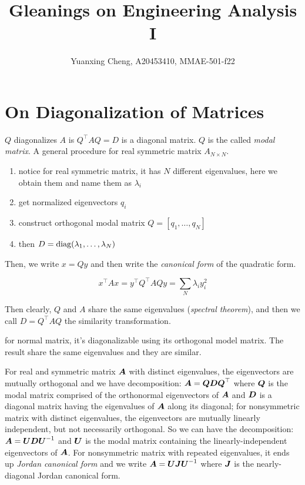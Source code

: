\documentclass{article}
\title{Gleanings on Engineering Analysis I}
\author{Yuanxing Cheng, A20453410, MMAE-501-f22}
\begin{document}
\maketitle

\section{On Diagonalization of Matrices}

\(Q\) diagonalizes \(A\) is \(Q^\top A Q =D\) is a diagonal matrix. \(Q\) is the called {\it modal matrix}. A general procedure for real symmetric matrix \(A_{N\times N}\).

\begin{enumerate}
    \item notice for real symmetric matrix, it has \(N\) different eigenvalues, here we obtain them and name them as \(\lambda_i\)
    \item get normalized eigenvectors \(q_i\)
    \item construct orthogonal modal matrix \(Q=[q_1,\dots,q_N]\)
    \item then \(D = \operatorname*{diag}(\lambda_1,\dots,\lambda_N)\)
\end{enumerate}

Then, we write \(x=Qy\) and then write the {\it canonical form} of the quadratic form.

\[x^\top A x=y^\top Q^\top AQ y = \sum_N \lambda_i y_i^2  \]

Then clearly, \(Q\) and \(A\) share the same eigenvalues ({\it spectral theorem}), and then we call \(D = Q^\top A Q\) the similarity transformation.


\begin{theorem}
    for normal matrix, it's diagonalizable using its orthogonal model matrix. The result share the same eigenvalues and they are similar.
\end{theorem}

\begin{remark}
    For real and symmetric matrix \(\boldsymbol{A}\) with distinct eigenvalues, the eigenvectors are mutually orthogonal and we have decomposition: \(\boldsymbol{A} = \boldsymbol{Q} \boldsymbol{D} \boldsymbol{Q}^\top\) where \(\boldsymbol{Q}\) is the modal matrix comprised of the orthonormal eigenvectors of \(\boldsymbol{A}\) and \(\boldsymbol{D}\) is a diagonal matrix having the eigenvalues of \(\boldsymbol{A}\) along its diagonal; for nonsymmetric matrix with distinct eigenvalues, the eigenvectors are mutually linearly independent, but not necessarily orthogonal. So we can have the decomposition: \(\boldsymbol{A} = \boldsymbol{U} \boldsymbol{D} \boldsymbol{U}^{-1}\) and \(\boldsymbol{U}\) is the modal matrix containing the linearly-independent eigenvectors of \(\boldsymbol{A}\). For nonsymmetric matrix with repeated eigenvalues, it ends up {\it Jordan canonical form} and we write \(\boldsymbol{A} = \boldsymbol{U}\boldsymbol{J}\boldsymbol{U}^{-1}\) where \(\boldsymbol{J}\) is the nearly-diagonal Jordan canonical form.
\end{remark}
\end{document}
